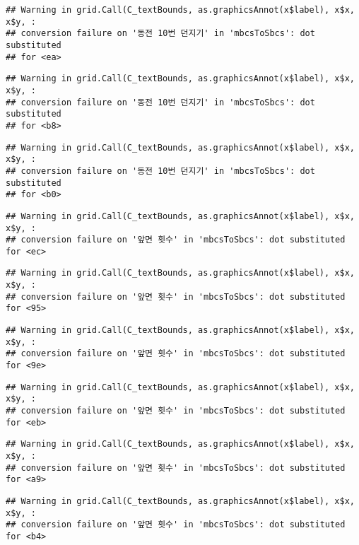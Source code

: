 \documentclass[]{book}
\begin{document}
\begin{verbatim}
## Warning in grid.Call(C_textBounds, as.graphicsAnnot(x$label), x$x, x$y, :
## conversion failure on '동전 10번 던지기' in 'mbcsToSbcs': dot substituted
## for <ea>
\end{verbatim}

\begin{verbatim}
## Warning in grid.Call(C_textBounds, as.graphicsAnnot(x$label), x$x, x$y, :
## conversion failure on '동전 10번 던지기' in 'mbcsToSbcs': dot substituted
## for <b8>
\end{verbatim}

\begin{verbatim}
## Warning in grid.Call(C_textBounds, as.graphicsAnnot(x$label), x$x, x$y, :
## conversion failure on '동전 10번 던지기' in 'mbcsToSbcs': dot substituted
## for <b0>
\end{verbatim}

\begin{verbatim}
## Warning in grid.Call(C_textBounds, as.graphicsAnnot(x$label), x$x, x$y, :
## conversion failure on '앞면 횟수' in 'mbcsToSbcs': dot substituted for <ec>
\end{verbatim}

\begin{verbatim}
## Warning in grid.Call(C_textBounds, as.graphicsAnnot(x$label), x$x, x$y, :
## conversion failure on '앞면 횟수' in 'mbcsToSbcs': dot substituted for <95>
\end{verbatim}

\begin{verbatim}
## Warning in grid.Call(C_textBounds, as.graphicsAnnot(x$label), x$x, x$y, :
## conversion failure on '앞면 횟수' in 'mbcsToSbcs': dot substituted for <9e>
\end{verbatim}

\begin{verbatim}
## Warning in grid.Call(C_textBounds, as.graphicsAnnot(x$label), x$x, x$y, :
## conversion failure on '앞면 횟수' in 'mbcsToSbcs': dot substituted for <eb>
\end{verbatim}

\begin{verbatim}
## Warning in grid.Call(C_textBounds, as.graphicsAnnot(x$label), x$x, x$y, :
## conversion failure on '앞면 횟수' in 'mbcsToSbcs': dot substituted for <a9>
\end{verbatim}

\begin{verbatim}
## Warning in grid.Call(C_textBounds, as.graphicsAnnot(x$label), x$x, x$y, :
## conversion failure on '앞면 횟수' in 'mbcsToSbcs': dot substituted for <b4>
\end{verbatim}
\end{document}
